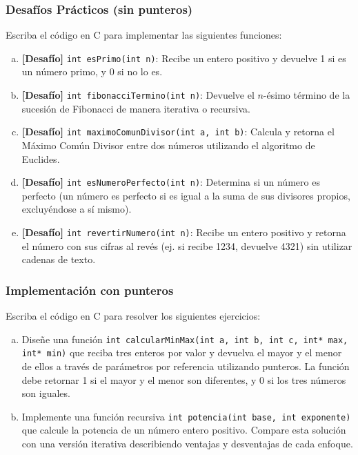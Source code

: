 \begin{ejercicioClase}
    \subsubsection{Desafíos Prácticos (sin punteros)}
    Escriba el código en C para implementar las siguientes funciones:
    \begin{enumerate}[a)]
        \item \textbf{[Desafío]} \texttt{int esPrimo(int n)}: Recibe un entero positivo y devuelve 1 si es un número primo, y 0 si no lo es.
        \item \textbf{[Desafío]} \texttt{int fibonacciTermino(int n)}: Devuelve el $n$-ésimo término de la sucesión de Fibonacci de manera iterativa o recursiva.
        \item \textbf{[Desafío]} \texttt{int maximoComunDivisor(int a, int b)}: Calcula y retorna el Máximo Común Divisor entre dos números utilizando el algoritmo de Euclides.
        \item \textbf{[Desafío]} \texttt{int esNumeroPerfecto(int n)}: Determina si un número es perfecto (un número es perfecto si es igual a la suma de sus divisores propios, excluyéndose a sí mismo).
        \item \textbf{[Desafío]} \texttt{int revertirNumero(int n)}: Recibe un entero positivo y retorna el número con sus cifras al revés (ej. si recibe 1234, devuelve 4321) sin utilizar cadenas de texto.
    \end{enumerate}

    \subsubsection{Implementación con punteros}
    Escriba el código en C para resolver los siguientes ejercicios:
    \begin{enumerate}[a)]
        \item Diseñe una función \texttt{int calcularMinMax(int a, int b, int c, int* max, int* min)} que reciba tres enteros por valor y devuelva el mayor y el menor de ellos a través de parámetros por referencia utilizando punteros. La función debe retornar 1 si el mayor y el menor son diferentes, y 0 si los tres números son iguales.
        \item Implemente una función recursiva \texttt{int potencia(int base, int exponente)} que calcule la potencia de un número entero positivo. Compare esta solución con una versión iterativa describiendo ventajas y desventajas de cada enfoque.
    \end{enumerate}
\end{ejercicioClase}

